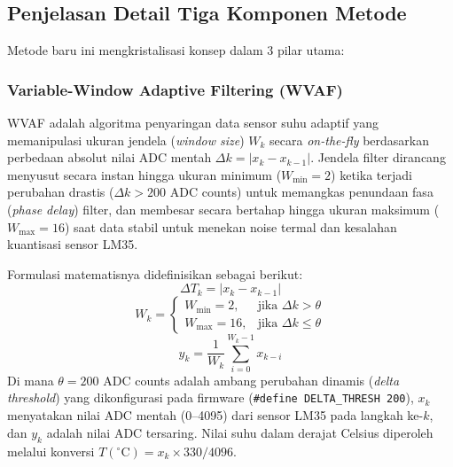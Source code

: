 \documentclass[11pt,a4paper]{article}
\begin{document}
\begin{longtable}
\subsection{Penjelasan Detail Tiga Komponen Metode}
\hspace{1.5em}Metode baru ini mengkristalisasi konsep dalam 3 pilar utama:

\subsubsection{Variable-Window Adaptive Filtering (WVAF)}
\hspace{1.5em}WVAF adalah algoritma penyaringan data sensor suhu adaptif yang memanipulasi ukuran jendela (\textit{window size}) $W_k$ secara \textit{on-the-fly} berdasarkan perbedaan absolut nilai ADC mentah $\Delta k = |x_k - x_{k-1}|$. Jendela filter dirancang menyusut secara instan hingga ukuran minimum ($W_{\min} = 2$) ketika terjadi perubahan drastis ($\Delta k > 200$ ADC counts) untuk memangkas penundaan fasa (\textit{phase delay}) filter, dan membesar secara bertahap hingga ukuran maksimum ($W_{\max} = 16$) saat data stabil untuk menekan noise termal dan kesalahan kuantisasi sensor LM35.

Formulasi matematisnya didefinisikan sebagai berikut:
\begin{equation}
\Delta T_k = |x_k - x_{k-1}|
\end{equation}
\begin{equation}
W_k = \begin{cases} W_{\min} = 2, & \text{jika } \Delta k > \theta \\ W_{\max} = 16, & \text{jika } \Delta k \le \theta \end{cases}
\end{equation}
\begin{equation}
y_k = \frac{1}{W_k}\sum_{i=0}^{W_k-1} x_{k-i}
\end{equation}
Di mana $\theta = 200$ ADC counts adalah ambang perubahan dinamis (\textit{delta threshold}) yang dikonfigurasi pada firmware (\texttt{\#define DELTA\_THRESH 200}), $x_k$ menyatakan nilai ADC mentah (0--4095) dari sensor LM35 pada langkah ke-$k$, dan $y_k$ adalah nilai ADC tersaring. Nilai suhu dalam derajat Celsius diperoleh melalui konversi $T(^\circ\text{C}) = x_k \times 330 / 4096$.


\end{longtable}
\end{document}
